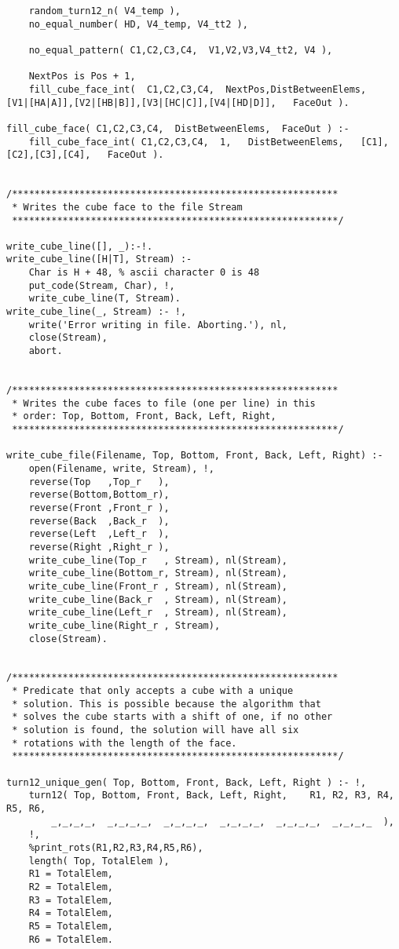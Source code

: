 \begin{lstlisting}
	random_turn12_n( V4_temp ),
	no_equal_number( HD, V4_temp, V4_tt2 ),

	no_equal_pattern( C1,C2,C3,C4,  V1,V2,V3,V4_tt2, V4 ),
	
	NextPos is Pos + 1,
	fill_cube_face_int(  C1,C2,C3,C4,  NextPos,DistBetweenElems,   [V1|[HA|A]],[V2|[HB|B]],[V3|[HC|C]],[V4|[HD|D]],   FaceOut ).
	
fill_cube_face( C1,C2,C3,C4,  DistBetweenElems,  FaceOut ) :-
	fill_cube_face_int( C1,C2,C3,C4,  1,   DistBetweenElems,   [C1],[C2],[C3],[C4],   FaceOut ).	


/**********************************************************
 * Writes the cube face to the file Stream
 **********************************************************/
 
write_cube_line([], _):-!.
write_cube_line([H|T], Stream) :-
	Char is H + 48, % ascii character 0 is 48
	put_code(Stream, Char), !,
	write_cube_line(T, Stream).
write_cube_line(_, Stream) :- !,
	write('Error writing in file. Aborting.'), nl,
	close(Stream),
	abort.
	
	
/**********************************************************
 * Writes the cube faces to file (one per line) in this
 * order: Top, Bottom, Front, Back, Left, Right, 
 **********************************************************/
 
write_cube_file(Filename, Top, Bottom, Front, Back, Left, Right) :-
	open(Filename, write, Stream), !,
	reverse(Top   ,Top_r   ),
	reverse(Bottom,Bottom_r),
	reverse(Front ,Front_r ),
	reverse(Back  ,Back_r  ),
	reverse(Left  ,Left_r  ),
	reverse(Right ,Right_r ),
	write_cube_line(Top_r   , Stream), nl(Stream),
	write_cube_line(Bottom_r, Stream), nl(Stream),
	write_cube_line(Front_r , Stream), nl(Stream),
	write_cube_line(Back_r  , Stream), nl(Stream),
	write_cube_line(Left_r  , Stream), nl(Stream),
	write_cube_line(Right_r , Stream),
	close(Stream).
	
	
/**********************************************************
 * Predicate that only accepts a cube with a unique
 * solution. This is possible because the algorithm that
 * solves the cube starts with a shift of one, if no other
 * solution is found, the solution will have all six
 * rotations with the length of the face.
 **********************************************************/
 
turn12_unique_gen( Top, Bottom, Front, Back, Left, Right ) :- !,
	turn12( Top, Bottom, Front, Back, Left, Right,    R1, R2, R3, R4, R5, R6,
		_,_,_,_,  _,_,_,_,  _,_,_,_,  _,_,_,_,  _,_,_,_,  _,_,_,_  ),
	!,	
	%print_rots(R1,R2,R3,R4,R5,R6),
	length( Top, TotalElem ),	
	R1 = TotalElem,
	R2 = TotalElem,
	R3 = TotalElem,
	R4 = TotalElem,
	R5 = TotalElem,
	R6 = TotalElem.



\end{lstlisting}
